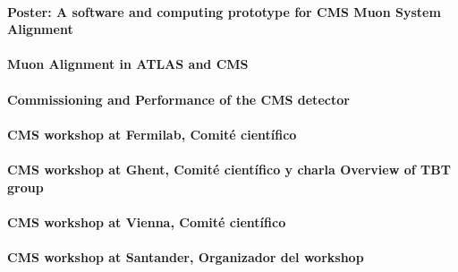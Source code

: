 \documentclass[a4paper, 11pt, twoside, openright]{report}
\begin{document}
\paragraph{Poster: A software and computing prototype for CMS Muon System Alignment}


\paragraph{Muon Alignment in ATLAS and CMS}


\paragraph{Commissioning and Performance of the CMS detector}


\paragraph{CMS workshop at Fermilab, Comité científico}


\paragraph{CMS workshop at Ghent, Comité científico y charla Overview of TBT group}


\paragraph{CMS workshop at Vienna, Comité científico}


\paragraph{CMS workshop at Santander, Organizador del workshop}

\end{document}
